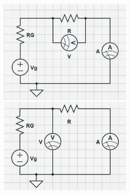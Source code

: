 \documentclass[a4paper]{article}
\begin{document}
\begin{center}
\includegraphics[width=0.5\textwidth]{grafici/config_1.jpg}
\label{fig:1}
\includegraphics[width=0.5\textwidth]{grafici/config_2.jpg}
\label{fig:2}
\end{center}
\end{document}
